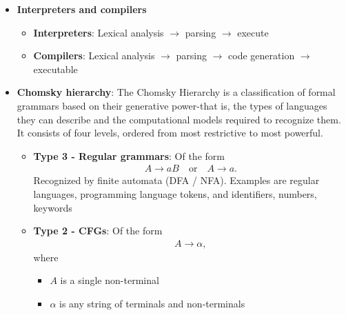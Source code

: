 \documentclass{report}
\begin{document}
\begin{itemize}
\begin{cppcode}
            \end{cppcode}
            \bigbreak \noindent 
            matches the grammar rule
            \bigbreak \noindent 
            \begin{align*}
                \text{assignment } \to \text{ identifier } = \text{ expression};
            .\end{align*}
            The component that performs syntactic analysis is called the parser.
        \item \textbf{Interpreters and compilers}
            \begin{itemize}
                \item \textbf{Interpreters}: Lexical analysis $\to$ parsing $\to$ execute
                \item \textbf{Compilers}: Lexical analysis $\to$ parsing $\to$ code generation $\to$ executable
            \end{itemize}
        \item \textbf{Chomsky hierarchy}: The Chomsky Hierarchy is a classification of formal grammars based on their generative power-that is, the types of languages they can describe and the computational models required to recognize them.
            \bigbreak \noindent 
            It consists of four levels, ordered from most restrictive to most powerful.
            \begin{itemize}
                \item \textbf{Type 3 - Regular grammars}: Of the form
                    \begin{align*}
                        A \to a B \quad \text{or} \quad A \to a 
                    .\end{align*}
                    Recognized by finite automata (DFA / NFA). Examples are regular languages, programming language tokens, and identifiers, numbers, keywords
                \item \textbf{Type 2 -  CFGs}: Of the form
                    \begin{align*}
                        A \to \alpha
                    ,\end{align*}
                    where
                    \begin{itemize}
                        \item $A$ is a single non-terminal
                        \item $\alpha$ is any string of terminals and non-terminals
                    \end{itemize}

\end{itemize}
\end{itemize}
\end{document}
